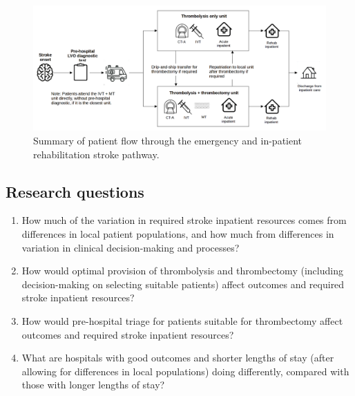\begin{figure}[htbp]
\centering
\includegraphics[width=1.0\textwidth]{./images/pathway}
\caption{Summary of patient flow through the emergency and in-patient rehabilitation stroke pathway.}
\label{fig:flow}
\end{figure}


\subsection*{Research questions}

\begin{enumerate}
    \item How much of the variation in required stroke inpatient resources comes from differences in local patient populations, and how much from differences in variation in clinical decision-making and processes?
    \item How would optimal provision of thrombolysis and thrombectomy (including decision-making on selecting suitable patients) affect outcomes and required stroke inpatient resources?
    \item How would pre-hospital triage for patients suitable for thrombectomy affect outcomes and required stroke inpatient resources?
    \item What are hospitals with good outcomes and shorter lengths of stay (after allowing for differences in local populations) doing differently, compared with those with longer lengths of stay?
\end{enumerate}

